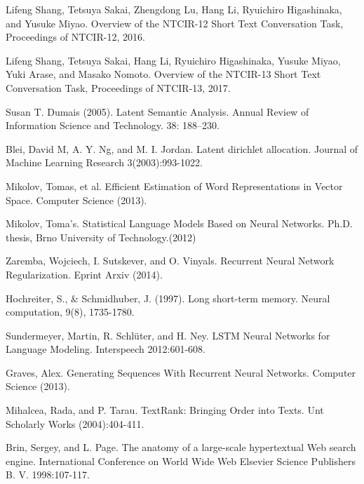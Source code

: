\documentclass{sig-alternate}
\begin{document}
%
%
\begin{thebibliography}{5}

Lifeng Shang, Tetsuya Sakai, Zhengdong Lu, Hang Li, Ryuichiro Higashinaka, and Yusuke Miyao. 
Overview of the NTCIR-12 Short Text Conversation Task, Proceedings of NTCIR-12, 2016.

Lifeng Shang, Tetsuya Sakai, Hang Li, Ryuichiro Higashinaka, Yusuke Miyao, Yuki Arase, and Masako Nomoto. 
Overview of the NTCIR-13 Short Text Conversation Task, Proceedings of NTCIR-13, 2017.

Susan T. Dumais (2005). Latent Semantic Analysis. Annual Review of Information Science and Technology. 38: 188–230. 

Blei, David M, A. Y. Ng, and M. I. Jordan. Latent dirichlet allocation. Journal of Machine Learning Research 3(2003):993-1022.

Mikolov, Tomas, et al. Efficient Estimation of Word Representations in Vector Space. Computer Science (2013).

Mikolov, Toma's. Statistical Language Models Based on Neural Networks. Ph.D. thesis, Brno University of Technology.(2012)

Zaremba, Wojciech, I. Sutskever, and O. Vinyals. Recurrent Neural Network Regularization. Eprint Arxiv (2014).

Hochreiter, S., \& Schmidhuber, J. (1997). Long short-term memory. Neural computation, 9(8), 1735-1780.

Sundermeyer, Martin, R. Schlüter, and H. Ney. LSTM Neural Networks for Language Modeling. Interspeech 2012:601-608.

Graves, Alex. Generating Sequences With Recurrent Neural Networks. Computer Science (2013).

Mihalcea, Rada, and P. Tarau. TextRank: Bringing Order into Texts. Unt Scholarly Works (2004):404-411.

Brin, Sergey, and L. Page. The anatomy of a large-scale hypertextual Web search engine. International Conference on World Wide Web Elsevier Science Publishers B. V. 1998:107-117.


\end{thebibliography}
\end{document}
